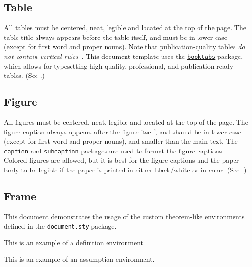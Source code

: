   
\subsection{Table}

All tables must be centered, neat, legible and located at the top of the page.
The table title always appears before the table itself, and must be in lower case (except for first word and proper nouns).
Note that publication-quality tables \emph{do not contain vertical rules}~\autocite{neurips2023template}. 
This document template uses the \href{https://www.ctan.org/pkg/booktabs}{\Verb|booktabs|} package, which allows for typesetting high-quality, professional, and publication-ready tables. 
(See .)


\subsection{Figure}

All figures must be centered, neat, legible and located at the top of the page. 
The figure caption always appears after the figure itself, and should be in lower case (except for first word and proper nouns), and smaller than the main text. 
The \Verb|caption| and \Verb|subcaption| packages are used to format the figure captions.
Colored figures are allowed, but it is best for the figure captions and the paper body to be legible if the paper is printed in either black/white or in color.
(See .)


\subsection{Frame}

This document demonstrates the usage of the custom theorem-like environments defined in the \texttt{document.sty} package.

\begin{definition}
  This is an example of a definition environment.
\end{definition}

\begin{assumption}
  This is an example of an assumption environment.
\end{assumption}

